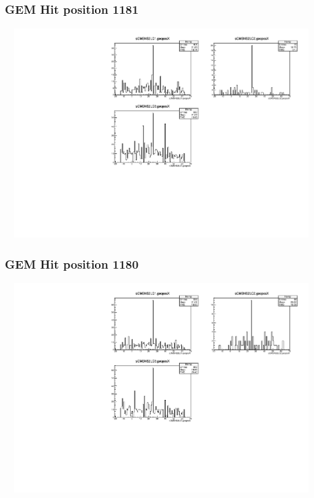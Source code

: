 \documentclass[slidestop,compress,mathserif]{beamer}
\begin{document}
\begin{frame}\frametitle{GEM Hit position 1181}
	 \includegraphics[width=12cm,height=8cm]{GEM_Hit_position_1181.pdf}
\end{frame}
\begin{frame}\frametitle{GEM Hit position 1180}
	 \includegraphics[width=12cm,height=8cm]{GEM_Hit_position_1180.pdf}
\end{frame}
\end{document}
